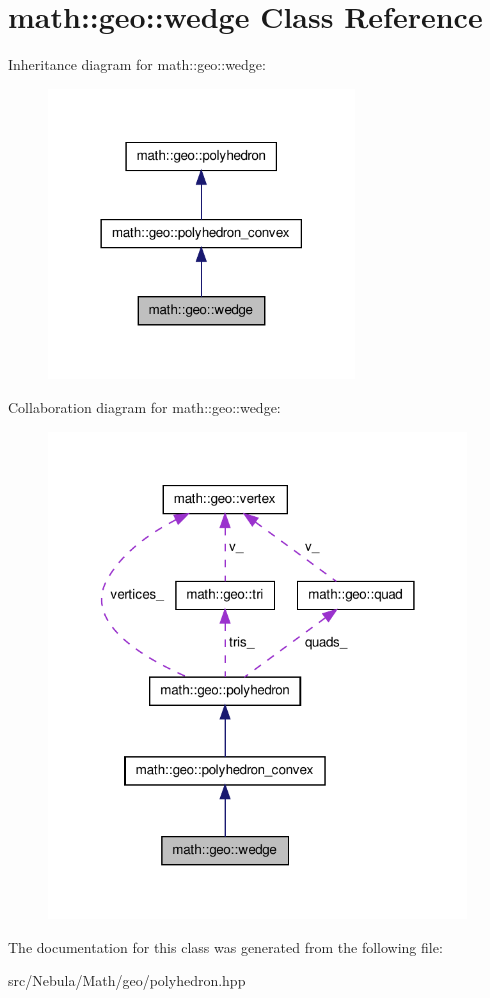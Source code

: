 \hypertarget{classmath_1_1geo_1_1wedge}{\section{math\-:\-:geo\-:\-:wedge \-Class \-Reference}
\label{classmath_1_1geo_1_1wedge}
}


\-Inheritance diagram for math\-:\-:geo\-:\-:wedge\-:\nopagebreak
\begin{figure}[H]
\begin{center}
\leavevmode
\includegraphics[width=230pt]{classmath_1_1geo_1_1wedge__inherit__graph}
\end{center}
\end{figure}


\-Collaboration diagram for math\-:\-:geo\-:\-:wedge\-:\nopagebreak
\begin{figure}[H]
\begin{center}
\leavevmode
\includegraphics[width=314pt]{classmath_1_1geo_1_1wedge__coll__graph}
\end{center}
\end{figure}


\-The documentation for this class was generated from the following file\-:\begin{DoxyCompactItemize}
\item 
src/\-Nebula/\-Math/geo/polyhedron.\-hpp\end{DoxyCompactItemize}
